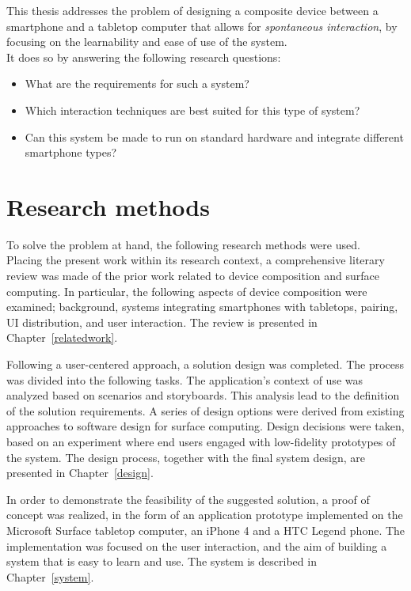 This thesis addresses the problem of 
designing a composite device between a smartphone and a tabletop computer that allows for \emph{spontaneous interaction}, by focusing on the learnability and ease of use of the system.
\\
\linebreak
It does so by answering the following research questions:
\begin{itemize}
\item What are the requirements for such a system?
\item Which interaction techniques are best suited for this type of system?
\item Can this system be made to run on standard hardware and integrate different smartphone types?
\end{itemize}

\section{Research methods}

To solve the problem at hand, the following research methods were used.
\\
\linebreak
Placing the present work within its research context, 
a comprehensive literary review was made of the prior work related to device composition and surface computing.
In particular, the following aspects of device composition were examined; background, systems integrating smartphones with tabletops, pairing, UI distribution, and user interaction.
The review is presented in Chapter~\ref{relatedwork}.

Following a user-centered approach, a solution design was completed.
The process was divided into the following tasks.
The application's context of use was analyzed based on scenarios and storyboards.
This analysis lead to the definition of the solution requirements.
A series of design options were derived from existing approaches to software design for surface computing.
Design decisions were taken, based on an experiment where end users engaged with low-fidelity prototypes of the system.
The design process, together with the final system design, are presented in Chapter~\ref{design}.

In order to demonstrate the feasibility of the suggested solution, a proof of concept was realized, in the form of an application prototype implemented on the Microsoft Surface tabletop computer, an iPhone 4 and a HTC Legend phone.
The implementation was focused on the user interaction, and the aim of building a system that is easy to learn and use.
The system is described in Chapter~\ref{system}.

